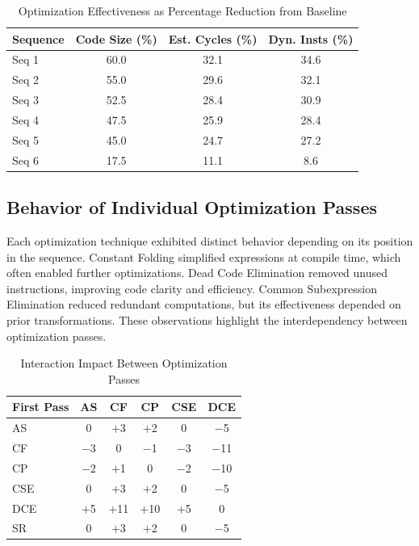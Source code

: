 \documentclass[conference]{IEEEtran}
\begin{document}
\begin{table}[!htbp]
\centering
\small
\caption{Optimization Effectiveness as Percentage Reduction from Baseline}
\label{tab:optimization_reduction}
\renewcommand{\arraystretch}{1.15}

\begin{tabular}{lccc}
\toprule
\textbf{Sequence} &
\textbf{Code Size (\%)} &
\textbf{Est. Cycles (\%)} &
\textbf{Dyn. Insts (\%)} \\
\midrule
Seq 1 & 60.0 & 32.1 & 34.6 \\
Seq 2 & 55.0 & 29.6 & 32.1 \\
Seq 3 & 52.5 & 28.4 & 30.9 \\
Seq 4 & 47.5 & 25.9 & 28.4 \\
Seq 5 & 45.0 & 24.7 & 27.2 \\
Seq 6 & 17.5 & 11.1 & 8.6 \\
\bottomrule
\end{tabular}

\end{table}

\subsection{Behavior of Individual Optimization Passes}
Each optimization technique exhibited distinct behavior depending on its position in the sequence. Constant Folding simplified expressions at compile time, which often enabled further optimizations. Dead Code Elimination removed unused instructions, improving code clarity and efficiency. Common Subexpression Elimination reduced redundant computations, but its effectiveness depended on prior transformations. These observations highlight the interdependency between optimization passes.

\begin{table}[!htbp]
\centering
\caption{Interaction Impact Between Optimization Passes}
\label{tab:pass_interaction}
\renewcommand{\arraystretch}{1.2}
{\small
\begin{tabularx}{\columnwidth}{@{}Xccccc@{}}
\toprule
\textbf{First Pass} & \textbf{AS} & \textbf{CF} & \textbf{CP} & \textbf{CSE} & \textbf{DCE} \\
\midrule
AS  & 0     & $+$3  & $+$2  & 0     & $-$5  \\
CF  & $-$3  & 0     & $-$1  & $-$3  & $-$11 \\
CP  & $-$2  & $+$1  & 0     & $-$2  & $-$10 \\
CSE & 0     & $+$3  & $+$2  & 0     & $-$5  \\
DCE & $+$5  & $+$11 & $+$10 & $+$5  & 0     \\
SR  & 0     & $+$3  & $+$2  & 0     & $-$5  \\
\bottomrule
\end{tabularx}
}
\end{table}
\end{document}
